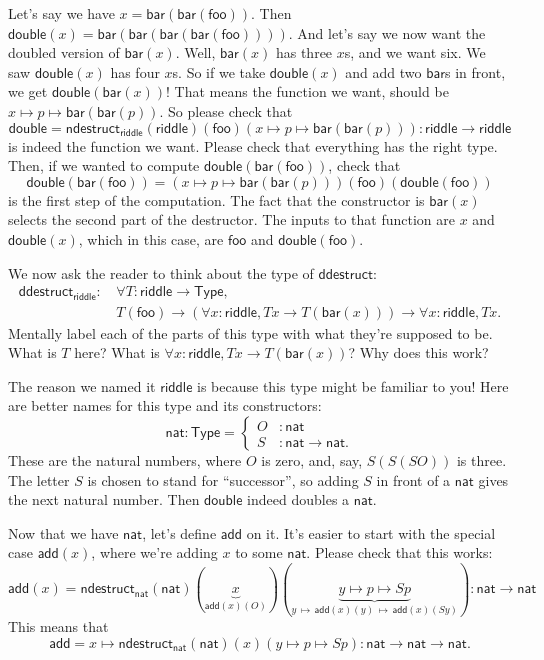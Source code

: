 \documentclass[11pt,paper=letter]{scrartcl}
\newcommand{\sf}{\mathsf}
\newcommand{\type}{\mathsf{Type}}
\newcommand{\smapsto}{\,\mapsto\,}
\begin{document}
Let's say we have $x = \sf{bar}(\sf{bar}(\sf{foo}))$. Then $\sf{double}(x) = \sf{bar}(\sf{bar}(\sf{bar}(\sf{bar}(\sf{foo}))))$. And let's say we now want the doubled version of $\sf{bar}(x)$. Well, $\sf{bar}(x)$ has three $x$s, and we want six. We saw $\sf{double}(x)$ has four $x$s. So if we take $\sf{double}(x)$ and add two $\sf{bar}$s in front, we get $\sf{double}(\sf{bar}(x))$! That means the function we want, should be $x \mapsto p \mapsto \sf{bar}(\sf{bar}(p))$. So please check that \[
\sf{double}
= \sf{ndestruct}_\sf{riddle}(\sf{riddle})(\sf{foo})(x \mapsto p \mapsto \sf{bar}(\sf{bar}(p))) : \sf{riddle} \to \sf{riddle}
\]
is indeed the function we want. Please check that everything has the right type. Then, if we wanted to compute $\sf{double}(\sf{bar}(\sf{foo}))$, check that \[
  \sf{double}(\sf{bar}(\sf{foo}))
  = (x \mapsto p \mapsto \sf{bar}(\sf{bar}(p)))
  (\sf{foo})(\sf{double}(\sf{foo}))
\]
is the first step of the computation. The fact that the constructor is $\sf{bar}(x)$ selects the second part of the destructor. The inputs to that function are $x$ and $\sf{double}(x)$, which in this case, are $\sf{foo}$ and $\sf{double}(\sf{foo})$.

We now ask the reader to think about the type of $\sf{ddestruct}$:
\begin{align*}
\sf{ddestruct}_{\sf{riddle}}:\,
& \forall T: \sf{riddle} \to \type,\\
&T(\sf{foo}) \to (\forall x: \sf{riddle}, Tx \to T(\sf{bar}(x))) \to \forall x: \sf{riddle}, Tx.
\end{align*}
Mentally label each of the parts of this type with what they're supposed to be. What is $T$ here? What is $\forall x: \sf{riddle}, Tx \to T(\sf{bar}(x))$? Why does this work?

The reason we named it $\sf{riddle}$ is because this type might be familiar to you! Here are better names for this type and its constructors: \[
  \sf{nat} : \type = \begin{cases}
    O &: \sf{nat} \\
    S &: \sf{nat} \to \sf{nat}.
  \end{cases}
\]
These are the natural numbers, where $O$ is zero, and, say, $S(S(SO))$ is three. The letter $S$ is chosen to stand for ``successor'', so adding $S$ in front of a $\sf{nat}$ gives the next natural number. Then $\sf{double}$ indeed doubles a $\sf{nat}$.

Now that we have $\sf{nat}$, let's define $\sf{add}$ on it. It's easier to start with the special case $\sf{add}(x)$, where we're adding $x$ to some $\sf{nat}$. Please check that this works: \[
  \sf{add}(x) = \sf{ndestruct}_\sf{nat}(\sf{nat})
  (\underbrace{x}_{\sf{add}(x)(O)})
  (\underbrace{y \mapsto p \mapsto Sp}_{y\smapsto\sf{add}(x)(y)\smapsto\sf{add}(x)(Sy)}) : \sf{nat} \to \sf{nat}
\]
This means that \[
  \sf{add} = x \mapsto \sf{ndestruct}_\sf{nat}(\sf{nat})(x)(y \mapsto p \mapsto Sp) : \sf{nat} \to \sf{nat} \to \sf{nat}.
\]
\end{document}
